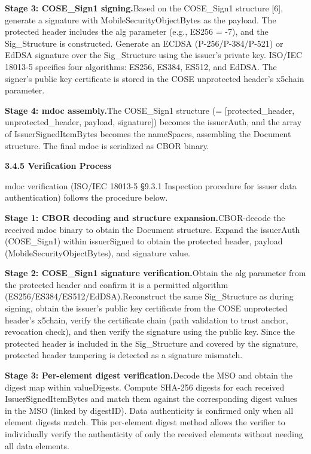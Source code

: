 \textbf{Stage 3: COSE\_Sign1 signing.}Based on the COSE\_Sign1 structure {[}6{]}, generate a signature with MobileSecurityObjectBytes as the payload. The protected header includes the alg parameter (e.g., ES256 = -7), and the Sig\_Structure is constructed. Generate an ECDSA (P-256/P-384/P-521) or EdDSA signature over the Sig\_Structure using the issuer's private key. ISO/IEC 18013-5 specifies four algorithms: ES256, ES384, ES512, and EdDSA. The signer's public key certificate is stored in the COSE unprotected header's x5chain parameter.

\textbf{Stage 4: mdoc assembly.}The COSE\_Sign1 structure (= {[}protected\_header, unprotected\_header, payload, signature{]}) becomes the issuerAuth, and the array of IssuerSignedItemBytes becomes the nameSpaces, assembling the Document structure. The final mdoc is serialized as CBOR binary.

\textbf{3.4.5 Verification Process}

mdoc verification (ISO/IEC 18013-5 §9.3.1 Inspection procedure for issuer data authentication) follows the procedure below.

\textbf{Stage 1: CBOR decoding and structure expansion.}CBOR-decode the received mdoc binary to obtain the Document structure. Expand the issuerAuth (COSE\_Sign1) within issuerSigned to obtain the protected header, payload (MobileSecurityObjectBytes), and signature value.

\textbf{Stage 2: COSE\_Sign1 signature verification.}Obtain the alg parameter from the protected header and confirm it is a permitted algorithm (ES256/ES384/ES512/EdDSA).Reconstruct the same Sig\_Structure as during signing, obtain the issuer's public key certificate from the COSE unprotected header's x5chain, verify the certificate chain (path validation to trust anchor, revocation check), and then verify the signature using the public key. Since the protected header is included in the Sig\_Structure and covered by the signature, protected header tampering is detected as a signature mismatch.

\textbf{Stage 3: Per-element digest verification.}Decode the MSO and obtain the digest map within valueDigests. Compute SHA-256 digests for each received IssuerSignedItemBytes and match them against the corresponding digest values in the MSO (linked by digestID). Data authenticity is confirmed only when all element digests match. This per-element digest method allows the verifier to individually verify the authenticity of only the received elements without needing all data elements.

